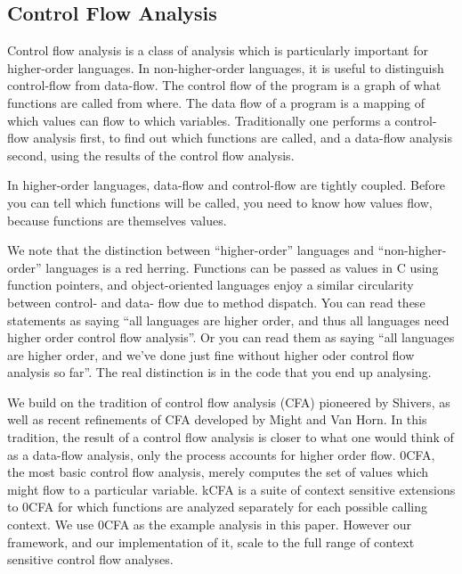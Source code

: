 \documentclass{article}
\begin{document}

\subsection{Control Flow Analysis}
\label{section:Background:ControlFlowAnalysis}

Control flow analysis is a class of analysis which is particularly important for higher-order languages.
In non-higher-order languages, it is useful to distinguish control-flow from data-flow.
The control flow of the program is a graph of what functions are called from where.
The data flow of a program is a mapping of which values can flow to which variables.
Traditionally one performs a control-flow analysis first, to find out which functions are called, and a data-flow analysis second, using the results of the control flow analysis.

In higher-order languages, data-flow and control-flow are tightly coupled.
Before you can tell which functions will be called, you need to know how values flow, because functions are themselves values.

We note that the distinction between “higher-order” languages and “non-higher-order” languages is a red herring.
Functions can be passed as values in C using function pointers, and object-oriented languages enjoy a similar circularity between control- and data- flow due to method dispatch.
You can read these statements as saying “all languages are higher order, and thus all languages need higher order control flow analysis”.
Or you can read them as saying “all languages are higher order, and we've done just fine without higher oder control flow analysis so far”.
The real distinction is in the code that you end up analysing.

We build on the tradition of control flow analysis (CFA) pioneered by Shivers, as well as recent refinements of CFA developed by Might and Van Horn.
In this tradition, the result of a control flow analysis is closer to what one would think of as a data-flow analysis, only the process accounts for higher order flow.
0CFA, the most basic control flow analysis, merely computes the set of values which might flow to a particular variable.
kCFA is a suite of context sensitive extensions to 0CFA for which functions are analyzed separately for each possible calling context.
We use 0CFA as the example analysis in this paper.
However our framework, and our implementation of it, scale to the full range of context sensitive control flow analyses.
\end{document}

